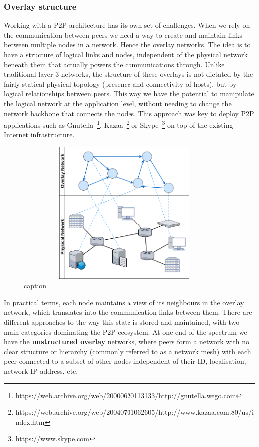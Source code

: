 \subsubsection{Overlay structure}\label{overlay-structure}

Working with a P2P architecture has its own set of challenges. When we
rely on the communication between peers we need a way to create and
maintain links between multiple nodes in a network. Hence the overlay
networks. The idea is to have a structure of logical links and nodes,
independent of the physical network beneath them that actually powers
the communications through. Unlike traditional layer-3 networks, the
structure of these overlays is not dictated by the fairly statical
physical topology (presence and connectivity of hosts), but by logical
relationships between peers. This way we have the potential to
manipulate the logical network at the application level, without needing
to change the network backbone that connects the nodes. This approach
was key to deploy P2P applications such as Gnutella~\footnote{https://web.archive.org/web/20000620113133/http://gnutella.wego.com},
Kazaa~\footnote{https://web.archive.org/web/20040701062605/http://www.kazaa.com:80/us/index.htm}
or Skype~\footnote{https://www.skype.com} on top of the existing Internet infrastructure.

\begin{figure}[hb!]
  \centering
  \includegraphics[max height=7cm,max width=0.95\textwidth]{img/overlay-vs-physical.png}
  \caption{caption}
  \label{fig:overlay-vs-physical}
\end{figure}

In practical terms, each node maintains a view of its neighbours in the
overlay network, which translates into the communication links between
them. There are different approaches to the way this state is stored and
maintained, with two main categories dominating the P2P ecosystem. At
one end of the spectrum we have the \textbf{unstructured overlay}
networks, where peers form a network with no clear structure or
hierarchy (commonly referred to as a network mesh) with each peer
connected to a subset of other nodes independent of their ID,
localisation, network IP address, etc.
\bigskip

